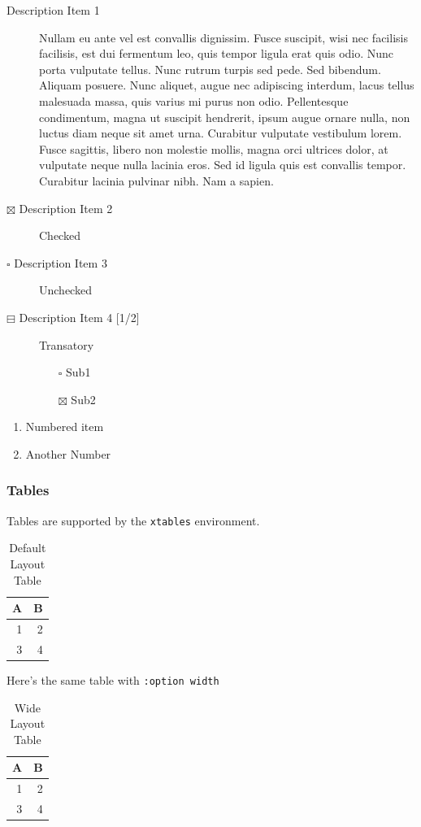 \documentclass[11pt]{article}
\begin{document}
\begin{description}
\item[{Description Item 1}] Nullam eu ante vel est convallis dignissim. Fusce
suscipit, wisi nec facilisis facilisis, est dui fermentum leo, quis tempor
ligula erat quis odio. Nunc porta vulputate tellus. Nunc rutrum turpis sed
pede. Sed bibendum. Aliquam posuere. Nunc aliquet, augue nec adipiscing
interdum, lacus tellus malesuada massa, quis varius mi purus non odio.
Pellentesque condimentum, magna ut suscipit hendrerit, ipsum augue ornare
nulla, non luctus diam neque sit amet urna. Curabitur vulputate vestibulum
lorem. Fusce sagittis, libero non molestie mollis, magna orci ultrices
dolor, at vulputate neque nulla lacinia eros. Sed id ligula quis est
convallis tempor. Curabitur lacinia pulvinar nibh. Nam a sapien.
\item[{$\boxtimes$ Description Item 2}] Checked
\item[{$\square$ Description Item 3}] Unchecked
\item[{$\boxminus$ Description Item 4 [1/2]}] Transatory
\begin{itemize}
\item[{$\square$}] Sub1
\item[{$\boxtimes$}] Sub2
\end{itemize}
\end{description}


\begin{enumerate}
\item Numbered item
\item Another Number
\end{enumerate}

\subsubsection{Tables}
\label{sec:orgaa8bb75}
Tables are supported by the \texttt{xtables} environment.

\begin{table}[htbp]
\caption{Default Layout Table}
\centering
\begin{tabular}{rr}
A & B\\
\hline
1 & 2\\
3 & 4\\
\end{tabular}
\end{table}

Here's the same table with \texttt{:option width}

\begin{table}[htbp]
\caption{Wide Layout Table}
\centering
\begin{tabular}{rr}
A & B\\
\hline
1 & 2\\
3 & 4\\
\end{tabular}
\end{table}
\end{document}
